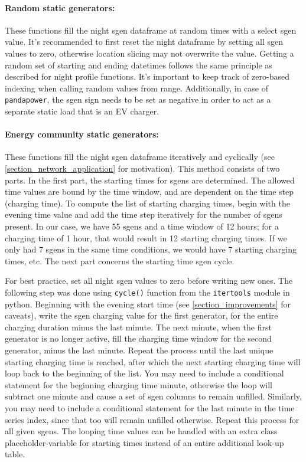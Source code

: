 \documentclass[a4paper,10pt]{report}
\begin{document}
\paragraph{Random static generators:} These functions fill the night sgen dataframe at random times with a select sgen value. It's recommended to first reset the night dataframe by setting all sgen values to zero, otherwise location slicing may not overwrite the value. Getting a random set of starting and ending datetimes follows the same principle as described for night profile functions. It's important to keep track of zero-based indexing when calling random values from range. Additionally, in case of \texttt{pandapower}, the sgen sign needs to be set as negative in order to act as a separate static load that is an EV charger.

\paragraph{Energy community static generators:} These functions fill the night sgen dataframe iteratively and cyclically (see \cref{section_network_application} for motivation). This method consists of two parts. In the first part, the starting times for sgens are determined. The allowed time values are bound by the time window, and are dependent on the time step (charging time). To compute the list of starting charging times, begin with the evening time value and add the time step iteratively for the number of sgens present. In our case, we have 55 sgens and a time window of 12 hours; for a charging time of 1 hour, that would result in 12 starting charging times. If we only had 7 sgens in the same time conditions, we would have 7 starting charging times, etc. The next part concerns the starting time sgen cycle.

For best practice, set all night sgen values to zero before writing new ones. The following step was done using \texttt{cycle()} function from the \texttt{itertools} module in python. Beginning with the evening start time (see \cref{section_improvements} for caveats), write the sgen charging value for the first generator, for the entire charging duration minus the last minute. The next minute, when the first generator is no longer active, fill the charging time window for the second generator, minus the last minute. Repeat the process until the last unique starting charging time is reached, after which the next starting charging time will loop back to the beginning of the list. You may need to include a conditional statement for the beginning charging time minute, otherwise the loop will subtract one minute and cause a set of sgen columns to remain unfilled. Similarly, you may need to include a conditional statement for the last minute in the time series index, since that too will remain unfilled otherwise. Repeat this process for all given sgens. The looping time values can be handled with an extra class placeholder-variable for starting times instead of an entire additional look-up table.
\end{document}
